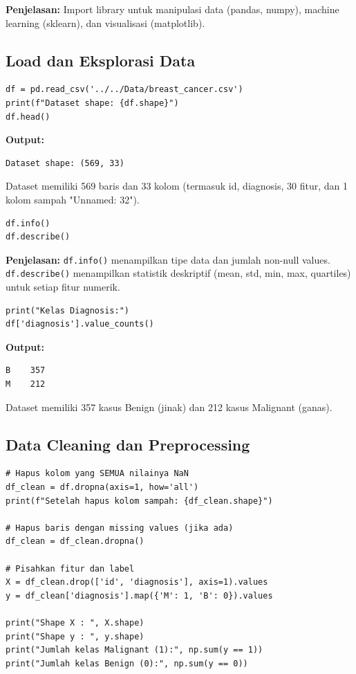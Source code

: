 \documentclass[12pt,a4paper]{article}
\begin{document}
\textbf{Penjelasan:} Import library untuk manipulasi data (pandas, numpy), machine learning (sklearn), dan visualisasi (matplotlib).

\subsection{Load dan Eksplorasi Data}

\begin{lstlisting}[caption=Load Dataset]
df = pd.read_csv('../../Data/breast_cancer.csv')
print(f"Dataset shape: {df.shape}")
df.head()
\end{lstlisting}

\textbf{Output:}
\begin{verbatim}
Dataset shape: (569, 33)
\end{verbatim}

Dataset memiliki 569 baris dan 33 kolom (termasuk id, diagnosis, 30 fitur, dan 1 kolom sampah "Unnamed: 32").

\begin{lstlisting}[caption=Informasi Dataset]
df.info()
df.describe()
\end{lstlisting}

\textbf{Penjelasan:} \texttt{df.info()} menampilkan tipe data dan jumlah non-null values. \texttt{df.describe()} menampilkan statistik deskriptif (mean, std, min, max, quartiles) untuk setiap fitur numerik.

\begin{lstlisting}[caption=Distribusi Kelas Target]
print("Kelas Diagnosis:")
df['diagnosis'].value_counts()
\end{lstlisting}

\textbf{Output:}
\begin{verbatim}
B    357
M    212
\end{verbatim}

Dataset memiliki 357 kasus Benign (jinak) dan 212 kasus Malignant (ganas).

\subsection{Data Cleaning dan Preprocessing}

\begin{lstlisting}[caption=Pembersihan Data]
# Hapus kolom yang SEMUA nilainya NaN
df_clean = df.dropna(axis=1, how='all')
print(f"Setelah hapus kolom sampah: {df_clean.shape}")

# Hapus baris dengan missing values (jika ada)
df_clean = df_clean.dropna()

# Pisahkan fitur dan label
X = df_clean.drop(['id', 'diagnosis'], axis=1).values
y = df_clean['diagnosis'].map({'M': 1, 'B': 0}).values

print("Shape X : ", X.shape)
print("Shape y : ", y.shape)
print("Jumlah kelas Malignant (1):", np.sum(y == 1))
print("Jumlah kelas Benign (0):", np.sum(y == 0))
\end{lstlisting}
\end{document}
